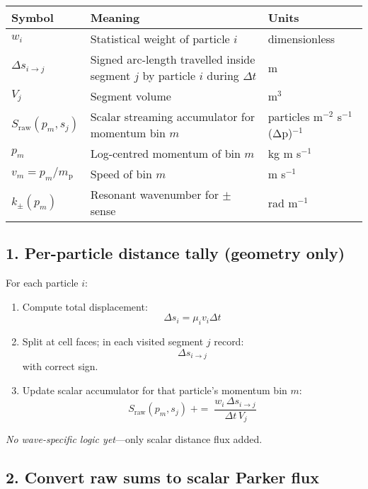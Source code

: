 {\begin{table}[h!]
\centering
\renewcommand{\arraystretch}{1.3}
\begin{tabular}{|p{4cm}|p{9.2cm}|p{3cm}|}
\hline
\textbf{Symbol} & \textbf{Meaning} & \textbf{Units} \\
\hline
$w_i$ & Statistical weight of particle $i$ & dimensionless \\
$\Delta s_{i \to j}$ & Signed arc-length travelled inside segment $j$ by particle $i$ during $\Delta t$ & m \\
$V_j$ & Segment volume & m$^3$ \\
$S_{\mathrm{raw}}(p_m, s_j)$ & Scalar streaming accumulator for momentum bin $m$ & particles m$^{-2}$ s$^{-1}$ (Δp)$^{-1}$ \\
$p_m$ & Log-centred momentum of bin $m$ & kg m s$^{-1}$ \\
$v_m = p_m/m_{\mathrm p}$ & Speed of bin $m$ & m s$^{-1}$ \\
$k_{\pm}(p_m)$ & Resonant wavenumber for $\pm$ sense & rad m$^{-1}$ \\
\hline
\end{tabular}
\end{table}

\subsection*{1. Per-particle distance tally (geometry only)}

For each particle $i$:
\begin{enumerate}
  \item Compute total displacement:
  \[
  \Delta s_i = \mu_i v_i \Delta t
  \]
  \item Split at cell faces; in each visited segment $j$ record:
  \[
  \Delta s_{i \to j}
  \]
  with correct sign.
  \item Update scalar accumulator for that particle’s momentum bin $m$:
  \begin{equation}
  S_{\mathrm{raw}}(p_m, s_j)
    \;{+}{=}\;
    \frac{w_i\,\Delta s_{i \to j}}{\,\Delta t\, V_j}
  \tag{1}
  \end{equation}
\end{enumerate}

\emph{No wave-specific logic yet}—only scalar distance flux added.

\subsection*{2. Convert raw sums to scalar Parker flux}

}
